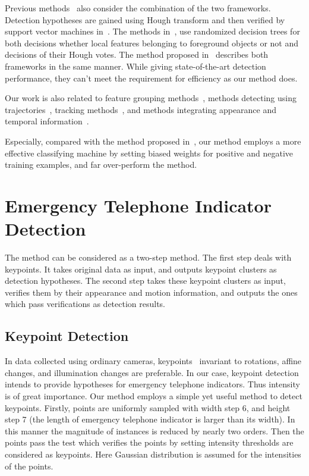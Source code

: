 Previous methods~\cite{ac34} also consider the combination of the two frameworks. Detection hypotheses are gained using Hough transform and then verified by support vector machines in~\cite{ac10,ac25}. The methods in~\cite{ac6,ac7}, use randomized decision trees for both decisions whether local features belonging to foreground objects or not and decisions of their Hough votes. The method proposed in~\cite{ac27} describes both frameworks in the same manner. While giving state-of-the-art detection performance, they can't meet the requirement for efficiency as our method does.

Our work is also related to feature grouping methods~\cite{ac25}, methods detecting using trajectories~\cite{my9,ac24}, tracking methods~\cite{my7,my10}, and methods integrating appearance and temporal information~\cite{ac23}.

Especially, compared with the method proposed in~\cite{wang1}, our method employs a more effective classifying machine by setting biased weights for positive and negative training examples, and far over-perform the method.

\section{Emergency Telephone Indicator Detection}
The method can be considered as a two-step method. The first step deals with keypoints. It
takes original data as input, and outputs keypoint clusters as detection hypotheses. The second
step takes these keypoint clusters as input, verifies them by their appearance and motion
information, and outputs the ones which pass verifications as detection results.

\subsection{Keypoint Detection}
In data collected using ordinary cameras, keypoints~\cite{o2,o12} invariant to rotations, affine changes, and illumination changes are preferable. In our case, keypoint detection intends to provide hypotheses for emergency telephone indicators. Thus intensity is of great importance. Our method employs a simple yet useful method to detect keypoints. Firstly, points are uniformly sampled with width step 6, and height step 7 (the length of emergency telephone indicator is larger than its width). In this manner the magnitude of instances is reduced by nearly two orders. Then the points pass the test which verifies the points by setting intensity thresholds are considered as keypoints.
Here Gaussian distribution is assumed for the intensities of the points.


